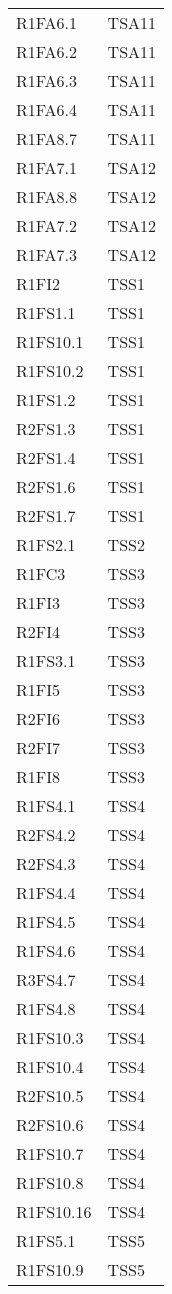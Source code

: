 {\begin{longtable}{C{4cm} C{4cm}}
R1FA6.1 & TSA11  \\
R1FA6.2 & TSA11  \\
R1FA6.3 & TSA11  \\
R1FA6.4 & TSA11  \\
R1FA8.7 & TSA11  \\

R1FA7.1 & TSA12  \\
R1FA8.8 & TSA12  \\
R1FA7.2 & TSA12  \\
R1FA7.3 & TSA12  \\

R1FI2 & TSS1 \\
R1FS1.1 & TSS1 \\
R1FS10.1 & TSS1 \\
R1FS10.2 & TSS1 \\
R1FS1.2 & TSS1 \\
R2FS1.3 & TSS1 \\
R2FS1.4 & TSS1 \\
R2FS1.6 & TSS1 \\
R2FS1.7 & TSS1 \\
R1FS2.1 & TSS2 \\
R1FC3 & TSS3 \\
R1FI3 & TSS3 \\
R2FI4 & TSS3 \\
R1FS3.1 & TSS3 \\
R1FI5 & TSS3 \\
R2FI6 & TSS3 \\
R2FI7 & TSS3 \\
R1FI8 & TSS3 \\
R1FS4.1 & TSS4 \\
R2FS4.2 & TSS4 \\
R2FS4.3 & TSS4 \\
R1FS4.4 & TSS4 \\
R1FS4.5 & TSS4 \\
R1FS4.6 & TSS4 \\
R3FS4.7 & TSS4 \\
R1FS4.8 & TSS4 \\
R1FS10.3 & TSS4 \\
R1FS10.4 & TSS4 \\
R2FS10.5 & TSS4 \\
R2FS10.6 & TSS4 \\
R1FS10.7 & TSS4 \\
R1FS10.8 & TSS4 \\
R1FS10.16 & TSS4 \\
R1FS5.1 & TSS5 \\
R1FS10.9 & TSS5 \\

\end{longtable}}
